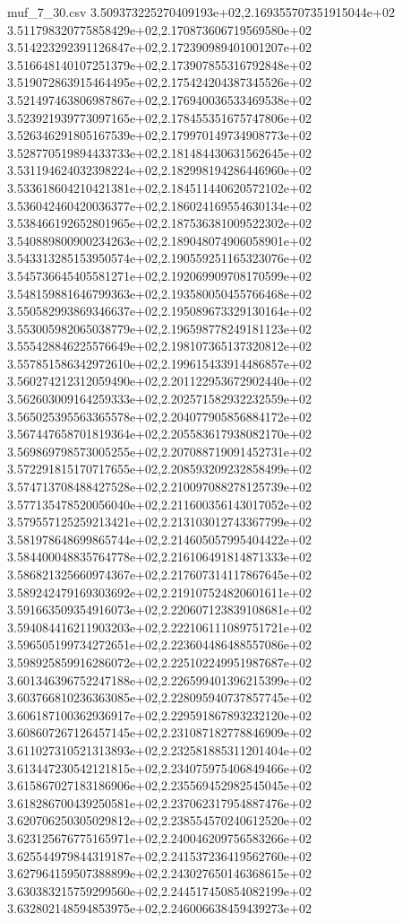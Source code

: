 \begin{filecontents*}{muf_7_30.csv}
3.509373225270409193e+02,2.169355707351915044e+02
3.511798320775858429e+02,2.170873606719569580e+02
3.514223292391126847e+02,2.172390989401001207e+02
3.516648140107251379e+02,2.173907855316792848e+02
3.519072863915464495e+02,2.175424204387345526e+02
3.521497463806987867e+02,2.176940036533469538e+02
3.523921939773097165e+02,2.178455351675747806e+02
3.526346291805167539e+02,2.179970149734908773e+02
3.528770519894433733e+02,2.181484430631562645e+02
3.531194624032398224e+02,2.182998194286446960e+02
3.533618604210421381e+02,2.184511440620572102e+02
3.536042460420036377e+02,2.186024169554630134e+02
3.538466192652801965e+02,2.187536381009522302e+02
3.540889800900234263e+02,2.189048074906058901e+02
3.543313285153950574e+02,2.190559251165323076e+02
3.545736645405581271e+02,2.192069909708170599e+02
3.548159881646799363e+02,2.193580050455766468e+02
3.550582993869346637e+02,2.195089673329130164e+02
3.553005982065038779e+02,2.196598778249181123e+02
3.555428846225576649e+02,2.198107365137320812e+02
3.557851586342972610e+02,2.199615433914486857e+02
3.560274212312059490e+02,2.201122953672902440e+02
3.562603009164259333e+02,2.202571582932232559e+02
3.565025395563365578e+02,2.204077905856884172e+02
3.567447658701819364e+02,2.205583617938082170e+02
3.569869798573005255e+02,2.207088719091452731e+02
3.572291815170717655e+02,2.208593209232858499e+02
3.574713708488427528e+02,2.210097088278125739e+02
3.577135478520056040e+02,2.211600356143017052e+02
3.579557125259213421e+02,2.213103012743367799e+02
3.581978648699865744e+02,2.214605057995404422e+02
3.584400048835764778e+02,2.216106491814871333e+02
3.586821325660974367e+02,2.217607314117867645e+02
3.589242479169303692e+02,2.219107524820601611e+02
3.591663509354916073e+02,2.220607123839108681e+02
3.594084416211903203e+02,2.222106111089751721e+02
3.596505199734272651e+02,2.223604486488557086e+02
3.598925859916286072e+02,2.225102249951987687e+02
3.601346396752247188e+02,2.226599401396215399e+02
3.603766810236363085e+02,2.228095940737857745e+02
3.606187100362936917e+02,2.229591867893232120e+02
3.608607267126457145e+02,2.231087182778846909e+02
3.611027310521313893e+02,2.232581885311201404e+02
3.613447230542121815e+02,2.234075975406849466e+02
3.615867027183186906e+02,2.235569452982545045e+02
3.618286700439250581e+02,2.237062317954887476e+02
3.620706250305029812e+02,2.238554570240612520e+02
3.623125676775165971e+02,2.240046209756583266e+02
3.625544979844319187e+02,2.241537236419562760e+02
3.627964159507388899e+02,2.243027650146368615e+02
3.630383215759299560e+02,2.244517450854082199e+02
3.632802148594853975e+02,2.246006638459439273e+02

\end{filecontents*}
